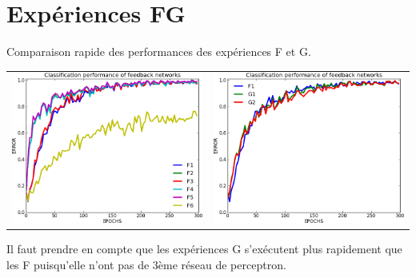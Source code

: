 \documentclass[a4paper,12pt]{article}
\begin{document}
  
  
  
  
  
  
  
  
  
  
  
  
  
  
  
  
  
  
  
  
  
  
  
  
  
  
  
  
  \section{Expériences FG}
  Comparaison rapide des performances des expériences F et G.
  \begin{center}
  \begin{tabular}{lr}
    \hspace*{-1cm}
    \includegraphics[width=250px]{data/expF.png}
    &
    \includegraphics[width=250px]{data/expG.png} 
  \end{tabular}
  \end{center}
  Il faut prendre en compte que les expériences G s'exécutent plus rapidement
  que les F puisqu'elle n'ont pas de 3ème réseau de perceptron.
  
  
\end{document}
